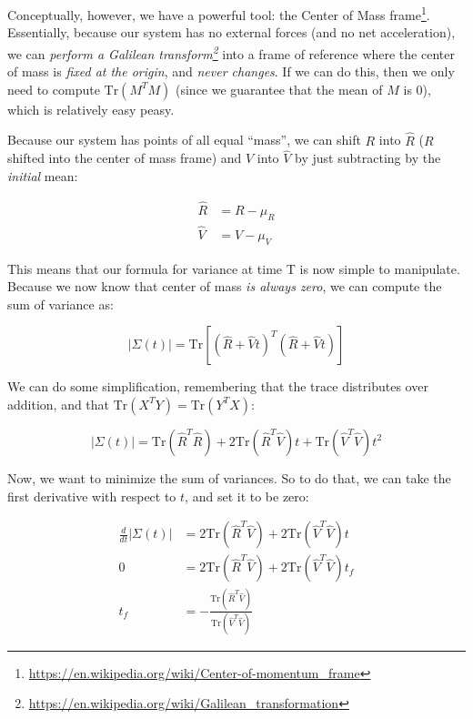 \documentclass[]{article}
\renewcommand{\href}[2]{#2\footnote{\url{#1}}}
\begin{document}
Conceptually, however, we have a powerful tool: the
\href{https://en.wikipedia.org/wiki/Center-of-momentum_frame}{Center of Mass
frame}. Essentially, because our system has no external forces (and no net
acceleration), we can \emph{perform a
\href{https://en.wikipedia.org/wiki/Galilean_transformation}{Galilean
transform}} into a frame of reference where the center of mass is \emph{fixed at
the origin}, and \emph{never changes}. If we can do this, then we only need to
compute \(\mathrm{Tr}
\left(M^T M \right)\) (since we guarantee that the mean of \(M\) is 0), which is
relatively easy peasy.

Because our system has points of all equal ``mass'', we can shift \(R\) into
\(\hat{R}\) (\(R\) shifted into the center of mass frame) and \(V\) into
\(\hat{V}\) by just subtracting by the \emph{initial} mean:

\[
\begin{aligned}
\hat{R} & = R - \mu_R \\
\hat{V} & = V - \mu_V
\end{aligned}
\]

This means that our formula for variance at time T is now simple to manipulate.
Because we now know that center of mass \emph{is always zero}, we can compute
the sum of variance as:

\[
\lvert \Sigma(t) \rvert = \mathrm{Tr} \left[ \left( \hat{R} + \hat{V} t \right)^T \left( \hat{R} + \hat{V} t \right) \right]
\]

We can do some simplification, remembering that the trace distributes over
addition, and that \(\mathrm{Tr} \left( X^T Y \right) = \mathrm{Tr} \left
(Y^T X \right)\):

\[
\lvert \Sigma(t) \rvert = \mathrm{Tr} (\hat{R}^T \hat{R})
                   + 2 \mathrm{Tr} (\hat{R}^T \hat{V}) t
                   + \mathrm{Tr} (\hat{V}^T \hat{V}) t^2
\]

Now, we want to minimize the sum of variances. So to do that, we can take the
first derivative with respect to \(t\), and set it to be zero:

\[
\begin{aligned}
\frac{d}{d t} \lvert \Sigma(t) \rvert & = 2 \mathrm{Tr} (\hat{R}^T \hat{V})
                                  + 2 \mathrm{Tr} (\hat{V}^T \hat{V}) t \\
0 & = 2 \mathrm{Tr} (\hat{R}^T \hat{V}) + 2 \mathrm{Tr} (\hat{V}^T \hat{V}) t_f \\
t_f & = - \frac{\mathrm{Tr} (\hat{R}^T \hat{V})}{\mathrm{Tr}(\hat{V}^T \hat{V})}
\end{aligned}
\]
\end{document}
